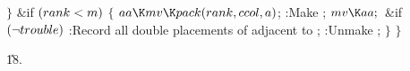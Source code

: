 \4${}\}{}$\2\2\6
\&{if} ${}(\\{rank}<\|m){}$\5
${}\{{}$\1\6
${}\\{aa}\K\\{mv}\K\\{pack}(\\{rank},\39\\{ccol},\39\|a){}$;\5
:Make \X;\5
${}\\{mv}\K\\{aa};{}$\6
\&{if} ${}(\lnot\\{trouble}){}$\1\5
:Record all double placements of  adjacent to \X;\2\6
:Unmake \X;\6
\4${}\}{}$\2\6
\4${}\}{}$\2\2\par
\U18.\fi

